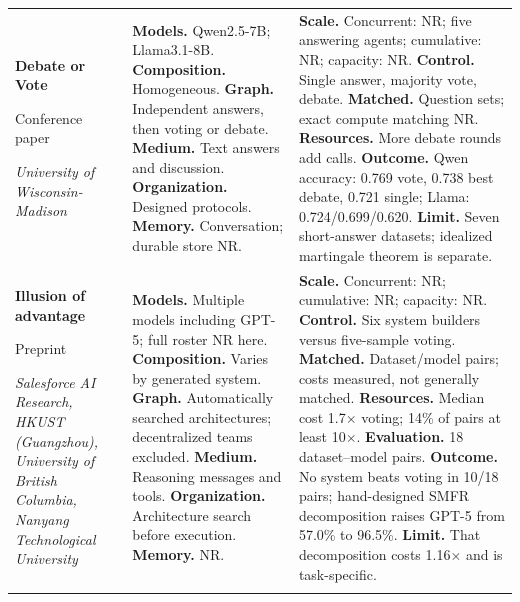 \begin{longtable}{@{}>{\raggedright\arraybackslash}p{}>{\raggedright\arraybackslash}p{}>{\raggedright\arraybackslash}p{}@{}}
\textbf{Debate or Vote}\par \citep{debate-or-vote}\par Conference paper\par\emph{University of Wisconsin-Madison} & \textbf{Models.} Qwen2.5-7B; Llama3.1-8B. \textbf{Composition.} Homogeneous. \textbf{Graph.} Independent answers, then voting or debate. \textbf{Medium.} Text answers and discussion. \textbf{Organization.} Designed protocols. \textbf{Memory.} Conversation; durable store NR. & \textbf{Scale.} Concurrent: NR; five answering agents; cumulative: NR; capacity: NR. \textbf{Control.} Single answer, majority vote, debate. \textbf{Matched.} Question sets; exact compute matching NR. \textbf{Resources.} More debate rounds add calls. \textbf{Outcome.} Qwen accuracy: 0.769 vote, 0.738 best debate, 0.721 single; Llama: 0.724/0.699/0.620. \textbf{Limit.} Seven short-answer datasets; idealized martingale theorem is separate. \\ \addlinespace[5pt]
\textbf{Illusion of advantage}\par \citep{illusion-multi-agent-advantage}\par Preprint\par\emph{Salesforce AI Research, HKUST (Guangzhou), University of British Columbia, Nanyang Technological University} & \textbf{Models.} Multiple models including GPT-5; full roster NR here. \textbf{Composition.} Varies by generated system. \textbf{Graph.} Automatically searched architectures; decentralized teams excluded. \textbf{Medium.} Reasoning messages and tools. \textbf{Organization.} Architecture search before execution. \textbf{Memory.} NR. & \textbf{Scale.} Concurrent: NR; cumulative: NR; capacity: NR. \textbf{Control.} Six system builders versus five-sample voting. \textbf{Matched.} Dataset/model pairs; costs measured, not generally matched. \textbf{Resources.} Median cost 1.7$\times$ voting; 14\% of pairs at least 10$\times$. \textbf{Evaluation.} 18 dataset--model pairs. \textbf{Outcome.} No system beats voting in 10/18 pairs; hand-designed SMFR decomposition raises GPT-5 from 57.0\% to 96.5\%. \textbf{Limit.} That decomposition costs 1.16$\times$ and is task-specific. \\ \addlinespace[5pt]

\end{longtable}
